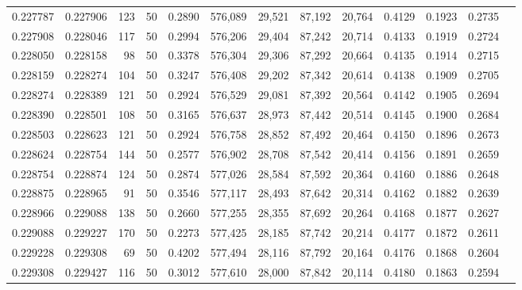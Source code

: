 \begin{tabular}{rrrrrrrrrrrrr}
0.227787 & 0.227906 &   123 &  50 &                                     0.2890 & 576,089 &  29,521 &  87,192 &  20,764 & 0.4129 & 0.1923 & 0.2735 \\
0.227908 & 0.228046 &   117 &  50 &                                     0.2994 & 576,206 &  29,404 &  87,242 &  20,714 & 0.4133 & 0.1919 & 0.2724 \\
0.228050 & 0.228158 &    98 &  50 &                                     0.3378 & 576,304 &  29,306 &  87,292 &  20,664 & 0.4135 & 0.1914 & 0.2715 \\
0.228159 & 0.228274 &   104 &  50 &                                     0.3247 & 576,408 &  29,202 &  87,342 &  20,614 & 0.4138 & 0.1909 & 0.2705 \\
0.228274 & 0.228389 &   121 &  50 &                                     0.2924 & 576,529 &  29,081 &  87,392 &  20,564 & 0.4142 & 0.1905 & 0.2694 \\
0.228390 & 0.228501 &   108 &  50 &                                     0.3165 & 576,637 &  28,973 &  87,442 &  20,514 & 0.4145 & 0.1900 & 0.2684 \\
0.228503 & 0.228623 &   121 &  50 &                                     0.2924 & 576,758 &  28,852 &  87,492 &  20,464 & 0.4150 & 0.1896 & 0.2673 \\
0.228624 & 0.228754 &   144 &  50 &                                     0.2577 & 576,902 &  28,708 &  87,542 &  20,414 & 0.4156 & 0.1891 & 0.2659 \\
0.228754 & 0.228874 &   124 &  50 &                                     0.2874 & 577,026 &  28,584 &  87,592 &  20,364 & 0.4160 & 0.1886 & 0.2648 \\
0.228875 & 0.228965 &    91 &  50 &                                     0.3546 & 577,117 &  28,493 &  87,642 &  20,314 & 0.4162 & 0.1882 & 0.2639 \\
0.228966 & 0.229088 &   138 &  50 &                                     0.2660 & 577,255 &  28,355 &  87,692 &  20,264 & 0.4168 & 0.1877 & 0.2627 \\
0.229088 & 0.229227 &   170 &  50 &                                     0.2273 & 577,425 &  28,185 &  87,742 &  20,214 & 0.4177 & 0.1872 & 0.2611 \\
0.229228 & 0.229308 &    69 &  50 &                                     0.4202 & 577,494 &  28,116 &  87,792 &  20,164 & 0.4176 & 0.1868 & 0.2604 \\
0.229308 & 0.229427 &   116 &  50 &                                     0.3012 & 577,610 &  28,000 &  87,842 &  20,114 & 0.4180 & 0.1863 & 0.2594 \\

\end{tabular}
